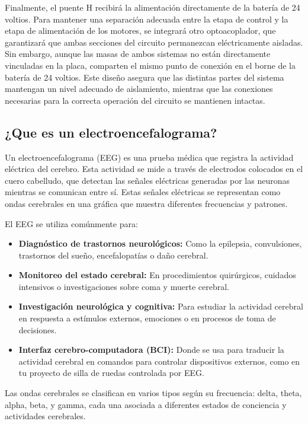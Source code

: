 \documentclass{article}
\begin{document}
Finalmente, el puente H recibirá la alimentación directamente de la batería de 24 voltios. Para mantener una separación adecuada entre la etapa de control y la etapa de alimentación de los motores, se integrará otro optoacoplador, que garantizará que ambas secciones del circuito permanezcan eléctricamente aisladas. Sin embargo, aunque las masas de ambos sistemas no están directamente vinculadas en la placa, comparten el mismo punto de conexión en el borne de la batería de 24 voltios. Este diseño asegura que las distintas partes del sistema mantengan un nivel adecuado de aislamiento, mientras que las conexiones necesarias para la correcta operación del circuito se mantienen intactas.

\subsection{¿Que es un electroencefalograma?}

Un electroencefalograma (EEG) es una prueba médica que registra la actividad eléctrica del cerebro. Esta actividad se mide a través de electrodos colocados en el cuero cabelludo, que detectan las señales eléctricas generadas por las neuronas mientras se comunican entre sí. Estas señales eléctricas se representan como ondas cerebrales en una gráfica que muestra diferentes frecuencias y patrones.

El EEG se utiliza comúnmente para:
\begin{itemize}
    \item \textbf{Diagnóstico de trastornos neurológicos:} Como la epilepsia, convulsiones, trastornos del sueño, encefalopatías o daño cerebral.
    \item \textbf{Monitoreo del estado cerebral:} En procedimientos quirúrgicos, cuidados intensivos o investigaciones sobre coma y muerte cerebral.
    \item \textbf{Investigación neurológica y cognitiva:} Para estudiar la actividad cerebral en respuesta a estímulos externos, emociones o en procesos de toma de decisiones.
    \item \textbf{Interfaz cerebro-computadora (BCI):} Donde se usa para traducir la actividad cerebral en comandos para controlar dispositivos externos, como en tu proyecto de silla de ruedas controlada por EEG.
    
\end{itemize}

Las ondas cerebrales se clasifican en varios tipos según su frecuencia: delta, theta, alpha, beta, y gamma, cada una asociada a diferentes estados de conciencia y actividades cerebrales.
\end{document}

